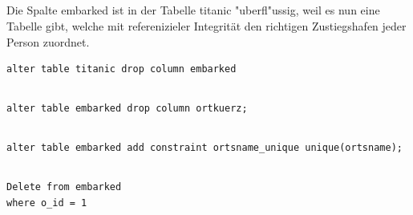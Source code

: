 \documentclass[a4paper, 11pt, titlepage]{article}
\begin{document}
\subsection{}
Die Spalte embarked ist in der Tabelle titanic "uberfl"ussig, weil es nun eine Tabelle gibt, welche mit referenizieler Integrität den richtigen Zustiegshafen jeder Person zuordnet.
\begin{verbatim}
alter table titanic drop column embarked
\end{verbatim}
\subsection{}
\begin{verbatim}
alter table embarked drop column ortkuerz;
\end{verbatim}
\subsection{}
\begin{verbatim}
alter table embarked add constraint ortsname_unique unique(ortsname);
\end{verbatim}
\subsection{}
\begin{verbatim}
Delete from embarked
where o_id = 1
\end{verbatim}
\end{document}
